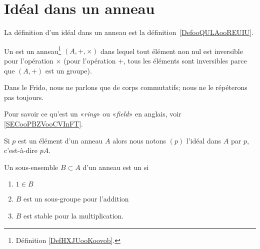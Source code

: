 


\section{Idéal dans un anneau}

La définition d'un idéal dans un anneau est la définition~\ref{DefooQULAooREUIU}.

\begin{definition}  \label{DefTMNooKXHUd}
	Un  est un anneau\footnote{Définition \ref{DefHXJUooKoovob}.} \( (A, +,\times)\) dans lequel tout élément non nul est inversible pour l'opération \( \times\) (pour l'opération \( +\), tous les éléments sont inversibles parce que \( (A,+)\) est un groupe).
\end{definition}

\begin{normaltext}
    Dans le Frido, nous ne parlons que de corps commutatifs; nous ne le répéterons pas toujours.
\end{normaltext}
 
\begin{normaltext}
    Pour savoir ce qu'est un «\emph{ring}» ou «\emph{field}» en anglais, voir \ref{SECooPBZVooCVInFT}.
\end{normaltext}

\begin{definition}  \label{DefSKTooOTauAR}
	Si \( p\) est un élément d'un anneau \( A\) alors nous notons \( (p)\) l'idéal dans \( A\)  par \( p\), c'est-à-dire \( pA\).
\end{definition}

\begin{definition}  \label{DefAJVTPxb}
	Un sous-ensemble \( B\subset A\) d'un anneau est un  si
	\begin{enumerate}
		\item
		      \( 1\in B\)
		\item
		      \( B\) est un sous-groupe pour l'addition
		\item
		      \( B\) est stable pour la multiplication.
	\end{enumerate}
\end{definition}

